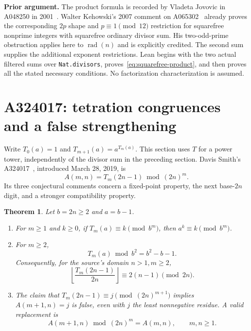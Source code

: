 \documentclass[11pt]{article}
\newtheorem{theorem}{Theorem}[section]
\begin{document}
\textbf{Prior argument.}
The product formula is recorded by Vladeta Jovovic in A048250 in
2001~\cite{A048250}. Walter Kehowski's 2007 comment on
A065302~\cite{A065302} already proves the corresponding $2p$ shape
and $p\equiv1\pmod{12}$ restriction for squarefree nonprime integers
with squarefree ordinary divisor sum. His two-odd-prime obstruction
applies here to $\operatorname{rad}(n)$ and is explicitly credited.
The second sum supplies the additional exponent restrictions.
Lean begins with the two actual filtered sums over \texttt{Nat.divisors},
proves~\eqref{eq:squarefree-product}, and then proves all the stated
necessary conditions. No factorization characterization is assumed.

\section{A324017: tetration congruences and a false strengthening}

Write $T_0(a)=1$ and $T_{m+1}(a)=a^{T_m(a)}$. This section uses $T$ for
a power tower, independently of the divisor sum in the preceding section.
Davis Smith's A324017~\cite{A324017}, introduced March 28, 2019, is
\[
A(m,n)=T_m(2n-1)\bmod(2n)^m.
\]
Its three conjectural comments concern a fixed-point property, the next
base-$2n$ digit, and a stronger compatibility property.

\begin{theorem}\label{thm:tetration}
Let $b=2n\ge2$ and $a=b-1$.
\begin{enumerate}
\item For $m\ge1$ and $k\ge0$, if $T_m(a)\equiv k\pmod{b^m}$,
then $a^k\equiv k\pmod{b^m}$.
\item For $m\ge2$,
\[
T_m(a)\bmod b^2=b^2-b-1.
\]
Consequently, for the source's domain $n>1,m\ge2$,
\[
\left\lfloor\frac{T_m(2n-1)}{2n}\right\rfloor
\equiv2(n-1)\pmod{2n}.
\]
\item The claim that $T_m(2n-1)\equiv j\pmod{(2n)^{m+1}}$
implies $A(m+1,n)=j$ is false, even with $j$ the least nonnegative
residue. A valid replacement is
\[
A(m+1,n)\bmod(2n)^m=A(m,n),\qquad m,n\ge1.
\]
\end{enumerate}
\end{theorem}
\end{document}
